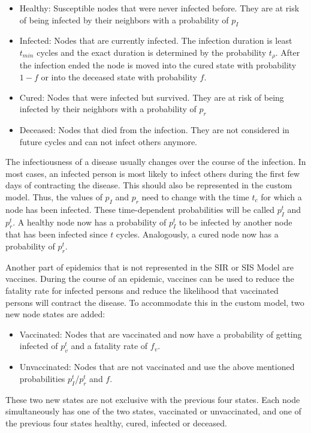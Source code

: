 \begin{itemize}
    \item Healthy: Susceptible nodes that were never infected before. They are at risk of being
    infected by their neighbors with a probability of $p_I$
    \item Infected: Nodes that are currently infected. The infection duration is least $t_{min}$ cycles and
    the exact duration is determined by the probability $t_\rho$. After the infection ended the
    node is moved into the cured state with probability $1-f$ or into the deceased state with
    probability $f$.
    \item Cured: Nodes that were infected but survived. They are at risk of being
    infected by their neighbors with a probability of $p_r$ 
    \item Deceased: Nodes that died from the infection. They are not considered in future cycles
    and can not infect others anymore.
\end{itemize}

The infectiousness of a disease usually changes over the course of the infection. In most
cases, an infected person is most likely to infect others during the first few days of contracting
the disease. This should also be represented in the custom model. Thus, the values of $p_I$ and $p_r$ need to change with the time $t_c$ for which a node has been infected. These time-dependent probabilities
will be called $p_I^t$ and $p_r^t$. A healthy node now has a probability of $p_I^t$ to
be infected by another node that has been infected since $t$ cycles. Analogously, a cured node 
now has a probability of $p_r^t$.

Another part of epidemics that is not represented in the SIR or SIS Model are vaccines.
During the course of an epidemic, vaccines can be used to reduce the fatality rate
for infected persons and reduce the likelihood that vaccinated persons will contract the disease. To accommodate this in the custom model, two new node states are added:
\begin{itemize}
    \item Vaccinated: Nodes that are vaccinated and now have a probability of getting infected
    of $p_v^t$ and a fatality rate of $f_v$.
    \item Unvaccinated: Nodes that are not vaccinated and use the above mentioned probabilities
    $p_I^t$/$p_r^t$ and $f$.
\end{itemize}
These two new states are not exclusive with the previous four states. Each node simultaneously
has one of the two states, vaccinated or unvaccinated, and one of the previous four states 
healthy, cured, infected or deceased.

